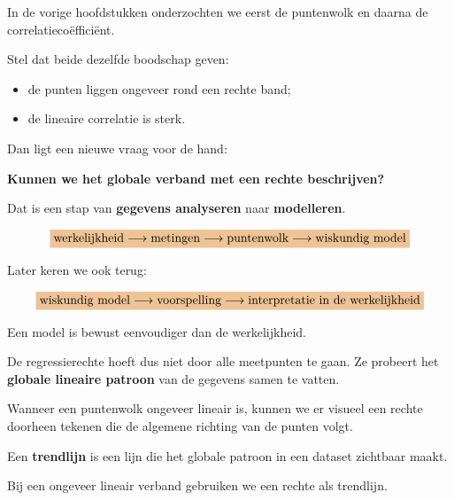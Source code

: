 \documentclass{ximera}
\begin{document}

In de vorige hoofdstukken onderzochten we eerst de puntenwolk en daarna
de correlatiecoëfficiënt.

Stel dat beide dezelfde boodschap geven:

\begin{itemize}
  \item de punten liggen ongeveer rond een rechte band;
  \item de lineaire correlatie is sterk.
\end{itemize}

Dan ligt een nieuwe vraag voor de hand:

\begin{center}
\textbf{Kunnen we het globale verband met een rechte beschrijven?}
\end{center}

Dat is een stap van \textbf{gegevens analyseren} naar
\textbf{modelleren}.

\[
\important{
\text{werkelijkheid}
\longrightarrow
\text{metingen}
\longrightarrow
\text{puntenwolk}
\longrightarrow
\text{wiskundig model}
}
\]

Later keren we ook terug:

\[
\important{
\text{wiskundig model}
\longrightarrow
\text{voorspelling}
\longrightarrow
\text{interpretatie in de werkelijkheid}
}
\]

\begin{opmerking}
Een model is bewust eenvoudiger dan de werkelijkheid.

De regressierechte hoeft dus niet door alle meetpunten te gaan.
Ze probeert het \textbf{globale lineaire patroon} van de gegevens
samen te vatten.
\end{opmerking}



Wanneer een puntenwolk ongeveer lineair is, kunnen we er visueel een
rechte doorheen tekenen die de algemene richting van de punten volgt.

\begin{definitie}
Een \textbf{trendlijn} is een lijn die het globale patroon in een
dataset zichtbaar maakt.

Bij een ongeveer lineair verband gebruiken we een rechte als trendlijn.
\end{definitie}
\end{document}
